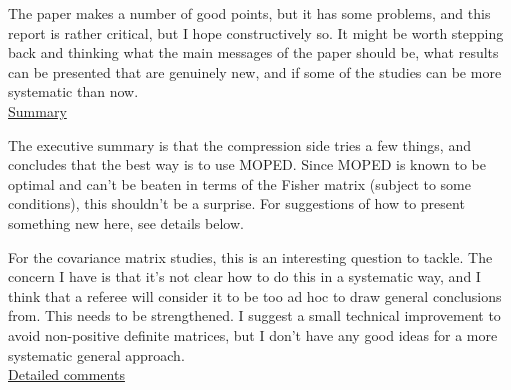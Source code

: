 \documentclass{article}
\begin{document}
	The paper makes a number of good points, but it has some problems, and this report is rather critical, but I hope constructively so.  It might be worth stepping back and thinking what the main messages of the paper should be, what results can be presented that are genuinely new, and if some of the studies can be more systematic than now.  \\
	
	\underline{Summary}
	
    The executive summary is that the compression side tries a few things, and concludes that the best way is to use MOPED.  Since MOPED is known to be optimal and can’t be beaten in terms of the Fisher matrix (subject to some conditions), this shouldn’t be a surprise.  For suggestions of how to present something new here, see details below.
	
	For the covariance matrix studies, this is an interesting question to tackle.  The concern I have is that it’s not clear how to do this in a systematic way, and I think that a referee will consider it to be too ad hoc to draw general conclusions from.  This needs to be strengthened.  I suggest a small technical improvement to avoid non-positive definite matrices, but I don’t have any good ideas for a more systematic general approach. \\
	
	\underline{Detailed comments}
	
\end{document}
